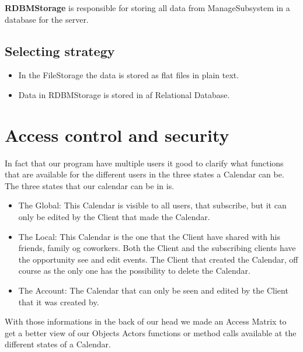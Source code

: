 \textbf{RDBMStorage} is responsible for storing all data from ManageSubsystem in a database for the server. 


\subsection*{Selecting strategy}
\begin{itemize}
	\item In the FileStorage the data is stored as flat files in plain text. 
	\item Data in RDBMStorage is stored in af Relational Database. 
\end{itemize}

\clearpage
\section*{Access control and security}

In fact that our program have multiple users it good to clarify what functions that are available for the different users in the three states a Calendar can be. The three states that our calendar can be in is.

\begin{itemize}
	\item The Global: This Calendar is visible to all users, that subscribe, but it can only be edited by the Client that made the Calendar.
	\item The Local: This Calendar is the one that the Client have shared with his friends, family og coworkers. Both the Client and the subscribing clients have the opportunity see and edit events. The Client that created the Calendar, off course as the only one has the possibility to delete the Calendar.
	\item The Account: The Calendar that can only be seen and edited by the Client that it was created by. 
\end{itemize}

With those informations in the back of our head we made an Access Matrix to get a better view of our Objects Actors functions or method calls available at the different states of a Calendar. 

